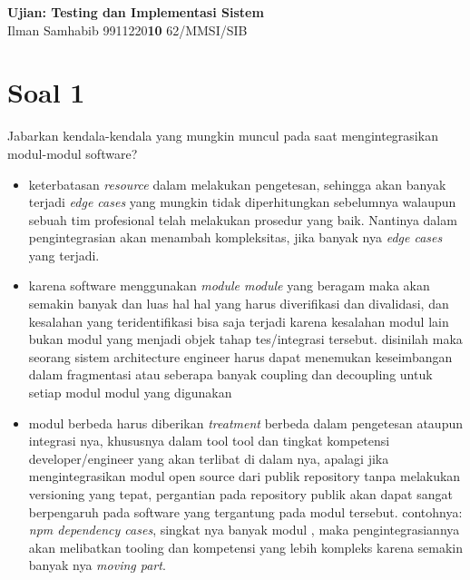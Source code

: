 \documentclass[12pt]{article}
\begin{document}
\begin{center}
   \textbf{Ujian: Testing dan Implementasi Sistem}
   \\Ilman Samhabib 9911220\textbf{10} 62/MMSI/SIB

\end{center}

\section*{Soal 1}
Jabarkan kendala-kendala yang mungkin muncul pada saat mengintegrasikan modul-modul software?

\begin{itemize}
    \item keterbatasan \emph{resource} dalam melakukan pengetesan, sehingga akan banyak terjadi \emph{edge cases} yang mungkin tidak diperhitungkan sebelumnya walaupun sebuah tim profesional telah melakukan prosedur yang baik. Nantinya dalam pengintegrasian akan menambah kompleksitas, jika banyak nya \emph{edge cases} yang terjadi.
    \item karena software menggunakan \emph{module module} yang beragam maka akan semakin banyak dan luas hal hal yang harus diverifikasi dan divalidasi, dan kesalahan yang teridentifikasi bisa saja terjadi karena kesalahan modul lain bukan modul yang menjadi objek tahap tes/integrasi tersebut.
    disinilah maka seorang sistem architecture engineer harus dapat menemukan keseimbangan dalam fragmentasi atau seberapa banyak coupling dan decoupling untuk setiap modul modul yang digunakan
    \item modul berbeda harus diberikan \emph{treatment} berbeda dalam pengetesan ataupun integrasi nya, khususnya dalam tool tool dan tingkat kompetensi developer/engineer yang akan terlibat di dalam nya, apalagi jika mengintegrasikan modul open source dari publik repository tanpa melakukan versioning yang tepat, pergantian pada repository publik akan dapat sangat berpengaruh pada software yang tergantung pada modul tersebut. contohnya: \emph{npm dependency cases}, singkat nya banyak modul , maka pengintegrasiannya akan melibatkan tooling dan kompetensi yang lebih kompleks karena semakin banyak nya \emph{moving part}.
\end{itemize}
\end{document}
